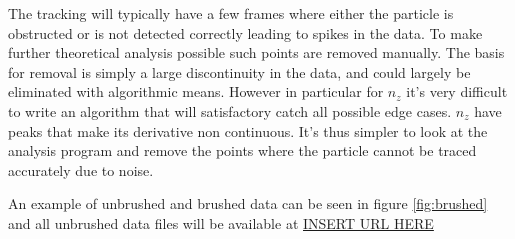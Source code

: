 The tracking will typically have a few frames where either the particle is obstructed or is not detected correctly 
leading to spikes in the data. To make further theoretical analysis possible such points are removed manually. The basis 
for removal is simply a large discontinuity in the data, and could largely be eliminated with algorithmic means. However 
in particular for $n_z$ it's very difficult to write an algorithm that will satisfactory catch all possible edge cases. 
$n_z$ have peaks that make its derivative non continuous. It's thus simpler to look at the analysis program and remove 
the points where the particle cannot be traced accurately due to noise. 

An example of unbrushed and brushed data can be seen in figure \ref{fig:brushed} and all unbrushed data files will be 
available at \url{INSERT URL HERE}

